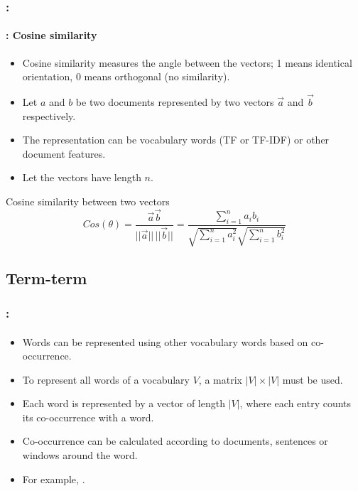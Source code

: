 \documentclass[xcolor=table]{beamer}
\begin{document}
\begin{frame}
	\frametitle{\insertshortsubtitle: \insertsection}
	\framesubtitle{\insertsubsection: Cosine similarity}

	\begin{minipage}{.68\textwidth}
	\begin{itemize}
		\item Cosine similarity measures the angle between the vectors; 1 means identical orientation, 0 means orthogonal (no similarity).
		\item Let $a$ and $b$ be two documents represented by two vectors $\overrightarrow{a}$ and $\overrightarrow{b}$ respectively.
		\item The representation can be vocabulary words (TF or TF-IDF) or other document features.
		\item Let the vectors have length $n$.
	\end{itemize}
	\end{minipage}
	\begin{minipage}{.3\textwidth}
	\end{minipage}
	
	\begin{block}{Cosine similarity between two vectors}
		\[
		Cos(\theta) = \frac{\overrightarrow{a} \overrightarrow{b}}{||\overrightarrow{a}||\, ||\overrightarrow{b}||}
		= \frac{\sum_{i=1}^{n} a_i b_i}{\sqrt{\sum_{i=1}^{n} a_i^2} \sqrt{\sum_{i=1}^{n} b_i^2}}
		\]
	\end{block}

\end{frame}

\subsection{Term-term}

\begin{frame}
	\frametitle{\insertshortsubtitle: \insertsection}
	\framesubtitle{\insertsubsection}

	\begin{itemize}
		\item Words can be represented using other vocabulary words based on co-occurrence.
		\item To represent all words of a vocabulary $ V $, a matrix $|V| \times |V|$ must be used.
		\item Each word is represented by a vector of length $|V|$, where each entry counts its co-occurrence with a  word.
		\item Co-occurrence can be calculated according to documents, sentences or windows around the word.
		\item For example, .
	\end{itemize}

\end{frame}
\end{document}
